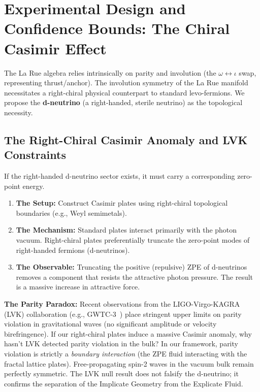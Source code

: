 \section{Experimental Design and Confidence Bounds: The Chiral Casimir Effect}\label{sec:experiment}

The La Rue algebra relies intrinsically on parity and involution (the $\omega \leftrightarrow \iota$ swap, representing thrust/anchor). The involution symmetry of the La Rue manifold necessitates a right-chiral physical counterpart to standard levo-fermions. We propose the \textbf{d-neutrino} (a right-handed, sterile neutrino) as the topological necessity.

\subsection{The Right-Chiral Casimir Anomaly and LVK Constraints}\label{sec:chiral}

If the right-handed d-neutrino sector exists, it must carry a corresponding zero-point energy.
\begin{enumerate}
    \item \textbf{The Setup:} Construct Casimir plates using right-chiral topological boundaries (e.g., Weyl semimetals).
    \item \textbf{The Mechanism:} Standard plates interact primarily with the photon vacuum. Right-chiral plates preferentially truncate the zero-point modes of right-handed fermions (d-neutrinos).
    \item \textbf{The Observable:} Truncating the positive (repulsive) ZPE of d-neutrinos removes a component that resists the attractive photon pressure. The result is a massive increase in attractive force.
\end{enumerate}

\textbf{The Parity Paradox:} Recent observations from the LIGO-Virgo-KAGRA (LVK) collaboration (e.g., GWTC-3~\cite{LVK_GWTC3}) place stringent upper limits on parity violation in gravitational waves (no significant amplitude or velocity birefringence). If our right-chiral plates induce a massive Casimir anomaly, why hasn't LVK detected parity violation in the bulk? In our framework, parity violation is strictly a \emph{boundary interaction} (the ZPE fluid interacting with the fractal lattice plates). Free-propagating spin-2 waves in the vacuum bulk remain perfectly symmetric. The LVK null result does not falsify the d-neutrino; it confirms the separation of the Implicate Geometry from the Explicate Fluid.

